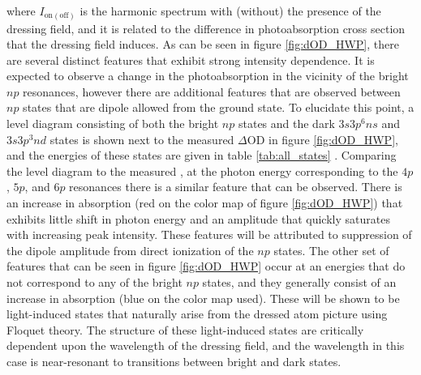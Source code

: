 where $I_{\mathrm{on} (\mathrm{off})}$ is the harmonic spectrum with (without) the presence of the dressing field, and it is related to the difference in photoabsorption cross section that the dressing field induces.  As can be seen in figure \ref{fig:dOD_HWP}, there are several distinct features that exhibit strong intensity dependence.  It is expected to observe a change in the photoabsorption in the vicinity of the bright $np$ resonances, however there are additional features that are observed between $np$ states that are dipole allowed from the ground state.  To elucidate this point, a level diagram consisting of both the bright $np$ states and the dark $3s3p^6ns$ and $3s3p^3nd$ states is shown next to the measured $\Delta\mathrm{OD}$ in figure \ref{fig:dOD_HWP}, and the energies of these states are given in table \ref{tab:all_states} \cite{caretteMulticonfigurationalHartreeFockClosecoupling2013, brionThresholdElectronImpact1970, fryarAnalysisEjectedelectronSpectra1976, juretaEnergyAngularAnalysis2016, ogurtsovAutoIonizationStatesArgon1970, sorensenArgon3sAutoionization1994}. Comparing the level diagram to the measured \dod, at the photon energy corresponding to the $4p$, $5p$, and $6p$ resonances there is a similar feature that can be observed.  There is an increase in absorption (red on the color map of figure \ref{fig:dOD_HWP}) that exhibits little shift in photon energy and an amplitude that quickly saturates with increasing peak intensity.  These features will be attributed to suppression of the dipole amplitude from direct ionization of the $np$ states.  The other set of features that can be seen in figure \ref{fig:dOD_HWP} occur at an energies that do not correspond to any of the bright $np$ states, and they generally consist of an increase in absorption (blue on the color map used).  These will be shown to be light-induced states that naturally arise from the dressed atom picture using Floquet theory.  The structure of these light-induced states are critically dependent upon the wavelength of the dressing field, and the wavelength in this case is near-resonant to transitions between bright and dark states.  
